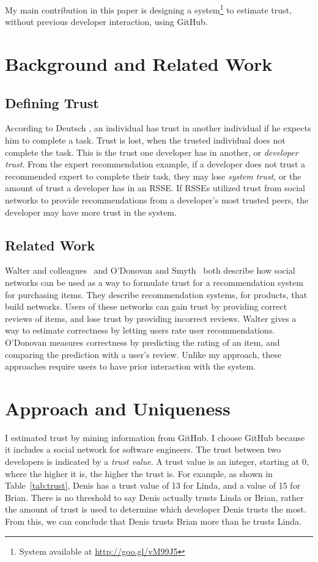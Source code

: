\documentclass{acm_proc_article-sp}
\begin{document}
  My main contribution in this paper is designing a system\footnote{System available at \url{http://goo.gl/vM99J5}} to estimate trust, without previous developer interaction, using GitHub.

\section{Background and Related Work}
  \subsection{Defining Trust}
    According to Deutsch \cite{6}, an individual has trust in another individual if he expects him to complete a task. Trust is lost, when the trusted individual does not complete the task. This is the trust one developer has in another, or \textit{developer trust}. From the expert recommendation example, if a developer does not trust a recommended expert to complete their task, they may lose \textit{system trust}, or the amount of trust a developer has in an RSSE. If RSSEs utilized trust from social networks to provide recommendations from a developer's most trusted peers, the developer may have more trust in the system.

  \subsection{Related Work}
    Walter and colleagues~\cite{3} and O'Donovan and Smyth~\cite{4} both describe how social networks can be used as a way to formulate trust for a recommendation system for purchasing items. They describe recommendation systems, for products, that build networks. Users of these networks can gain trust by providing correct reviews of items, and lose trust by providing incorrect reviews. Walter gives a way to estimate correctness by letting users rate user recommendations. O'Donovan measures correctness by predicting the rating of an item, and comparing the prediction with a user's review. Unlike my approach, these approaches require users to have prior interaction with the system.

\section{Approach and Uniqueness}

  I estimated trust by mining information from GitHub. I choose GitHub because it includes a social network for software engineers. The trust between two developers is indicated by a \textit{trust value}. A trust value is an integer, starting at 0, where the higher it is, the higher the trust is. For example, as shown in Table~\ref{tab:trust}, Denis has a trust value of 13 for Linda, and a value of 15 for Brian. There is no threshold to say Denis actually trusts Linda or Brian, rather the amount of trust is used to determine which developer Denis trusts the most. From this, we can conclude that Denis trusts Brian more than he trusts Linda.
\end{document}
